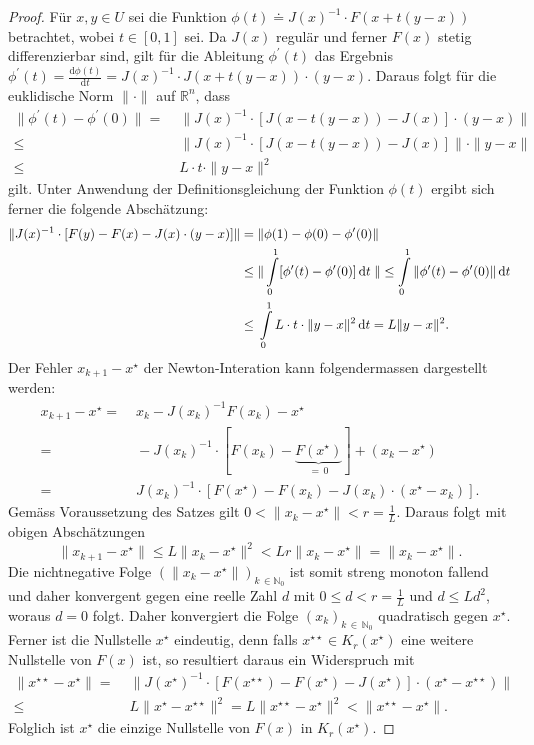 \documentclass[a4paper,12pt]{article}
\numberwithin{equation}{section}
\begin{document}
\begin{proof}
Für $x,y \in U$ sei die Funktion $\phi(t) \doteq J(x)^{-1}\cdot F(x+t(y-x))$ betrachtet, wobei $t \in [0,1]$ sei. Da $J(x)$ regulär und ferner $F(x)$ stetig differenzierbar sind, gilt für die Ableitung $\phi^\prime(t)$ das Ergebnis $\phi^\prime(t) = \frac{\mathrm{d}\phi(t)}{\mathrm{d}t} = J(x)^{-1}\cdot J(x+t(y-x))\cdot (y-x)$. Daraus folgt für die euklidische Norm $\|\cdot\|$ auf $\mathbb{R}^n$, dass \begin{align*}
\|\phi^\prime(t)-\phi^\prime(0)\| =&\; \|J(x)^{-1}\cdot [J(x-t(y-x))-J(x)]\cdot(y-x)\| \\
\leq&\; \|J(x)^{-1}\cdot [J(x-t(y-x))-J(x)]\|\cdot \|y-x\| \\
\leq&\; L\cdot t\cdot \|y-x\|^2
\end{align*} gilt. Unter Anwendung der Definitionsgleichung der Funktion $\phi(t)$ ergibt sich ferner die folgende Abschätzung:
\begin{align*}
\|J(x)^{-1}\cdot[F(y)-F(x)-J(x)\cdot (y-x)]\| =&\; \|\phi(1) - \phi(0) - \phi^\prime(0)\| \\
\leq&\; \| \int\displaylimits_{0}^{1} [\phi^\prime(t)-\phi^\prime(0)]\,\mathrm{d}t \; \| \leq \int\displaylimits_{0}^{1} \|\phi^\prime(t)-\phi^\prime(0) \| \,\mathrm{d}t \\
\leq&\; \int\displaylimits_{0}^{1} L\cdot t \cdot \|y-x\|^2\,\mathrm{d}t = L\|y-x\|^2.
\end{align*}
Der Fehler $x_{k+1}-x^\star$ der Newton-Interation kann folgendermassen dargestellt werden:
\begin{align*}
x_{k+1}-x^\star =&\; x_k - J(x_k)^{-1}F(x_k)-x^\star \\
=&\; -J(x_k)^{-1}\cdot[F(x_k)-\underbrace{F(x^\star)}_{=\,0}] + (x_k-x^\star) \\
=&\; J(x_k)^{-1}\cdot [F(x^\star)-F(x_k)-J(x_k)\cdot(x^\star-x_k)].
\end{align*} Gemäss Voraussetzung des Satzes gilt $0 < \|x_k-x^\star\| < r = \frac{1}{L}$. Daraus folgt mit obigen Abschätzungen \begin{equation*}
\|x_{k+1}-x^\star\| \leq L\|x_k-x^\star\|^2 < Lr\|x_k-x^\star\| = \|x_k-x^\star\|.
\end{equation*} Die nichtnegative Folge $(\|x_k-x^\star\|)_{k\,\in\mathbb{N}_0}$ ist somit streng monoton fallend und daher konvergent gegen eine reelle Zahl $d$ mit $0 \leq d < r = \frac{1}{L}$ und $d \leq Ld^2$, woraus $d=0$ folgt. Daher konvergiert die Folge $(x_k)_{k\,\in\,\mathbb{N}_0}$ quadratisch gegen $x^\star$. Ferner ist die Nullstelle $x^\star$ eindeutig, denn falls $x^{\star\star} \in K_r(x^\star)$ eine weitere Nullstelle von $F(x)$ ist, so resultiert daraus ein Widerspruch mit \begin{align*}
\|x^{\star\star} - x^\star\| =&\; \|J(x^\star)^{-1}\cdot[F(x^{\star\star})-F(x^\star)-J(x^\star)]\cdot(x^\star-x^{\star\star})\| \\ \leq&\; L\|x^\star-x^{\star\star}\|^2 = L\|x^{\star\star}-x^\star\|^2 < \|x^{\star\star} - x^\star\|.
\end{align*} Folglich ist $x^\star$ die einzige Nullstelle von $F(x)$ in $K_r(x^\star)$.
\end{proof}
\end{document}
